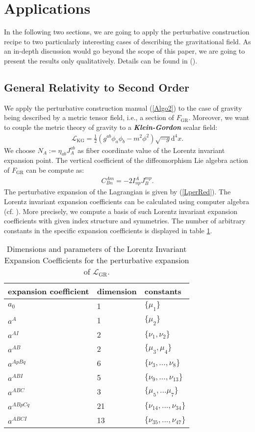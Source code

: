 \documentclass[%
 reprint,
nofootinbib,
 amsmath,amssymb,
 aps,
 prd,
floatfix,
]{revtex4-2}
\begin{document}
\section{Applications}
In the following two sections, we are going to apply the perturbative construction recipe to two particularly interesting cases of describing the gravitational field. 
As an in-depth discussion would go beyond the scope of this paper, we are going to present the results only qualitatively. Details can be found in (\cite{TobiMaster}).
\subsection{General Relativity to Second Order}
We apply the perturbative construction manual (\ref{Algo2}) to the case of gravity being described by a metric tensor field, i.e., a section of $F_{\text{GR}}$. 
Moreover, we want to couple the metric theory of gravity to a \textit{\textbf{Klein-Gordon}} scalar field:
\begin{align}\label{KGL}
    \mathcal{L}_{\text{KG}} = \frac{1}{2} \left ( g^{ab} \phi_a \phi_b - m^2 \phi^2\right )\sqrt{-g} \mathrm{d}^4x.
\end{align}
We choose $N_A := \eta_{ab} J_A^{ab} $ as fiber coordinate value of the Lorentz invariant expansion point. The vertical coefficient of the diffeomorphism Lie algebra action of $F_{\text{GR}}$ can be compute as:
\begin{align}
    C^{Am}_{Bn} = -2 I^A_{np} J_B^{mp}.
\end{align}
The perturbative expansion of the Lagrangian is given by (\ref{LperRed}).
The Lorentz invariant expansion coefficients can be calculated using computer algebra (cf. \cite{sparse-tensor}). More precisely, we compute a basis of such Lorentz invariant expansion coefficients with given index structure and symmetries. The number of arbitrary constants in the
specific expansion coefficients is displayed in table \ref{GRExp}.
\begin{table}
\centering 
\begin{tabular}{lll}\toprule
    expansion coefficient & dimension & constants   \\ \midrule
    $a_0$ & 1 & $\{\mu_1\}$ \\
    $a^A$ & 1 & $\{\mu_2\}$ \\
    $a^{AI}$ & 2 & $\{\nu_1, \nu_2\}$ \\
    $a^{AB}$ & 2 & $\{\mu_3, \mu_4 \} $ \\
    $a^{ApBq}$ & 6 & $\{\nu_3,...,\nu_8\}$ \\
    $a^{ABI}$ & 5 & $\{ \nu_9,...,\nu_{13} \}$ \\
    $a^{ABC}$ & 3 & $\{ \mu_5,...\mu_7 \}$\\
    $a^{ABpCq}$ & 21 & $\{\nu_{14},...,\nu_{34} \}$ \\
    $a^{ABCI}$ & 13 & $\{ \nu_{35},...,\nu_{47}\}$\\ \bottomrule
\end{tabular}
\caption{Dimensions and parameters of the Lorentz Invariant Expansion Coefficients for the perturbative expansion of $\mathcal{L}_{\text{GR}}$.}\label{GRExp}
\end{table}
\end{document}
